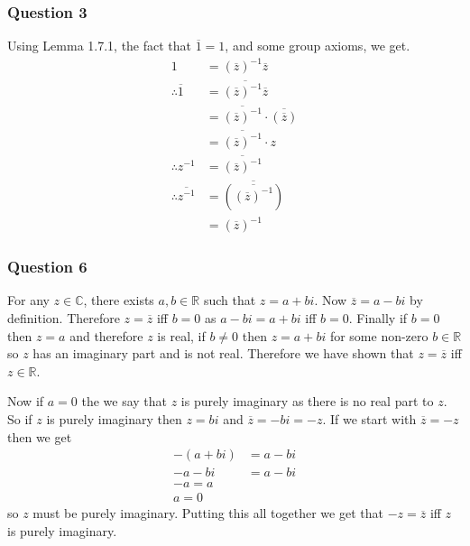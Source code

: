 \documentclass{article}
\begin{document}
\subsubsection{Question 3}
Using Lemma 1.7.1, the fact that $\overline 1 = 1$, and some group axioms, we get.
\begin{align*}
1 &= (\overline z)^{-1}\overline z \\
\therefore \overline 1 &= \overline{(\overline z)^{-1}\overline z} \\
&= \overline{(\overline z)^{-1}}\cdot\overline{(\overline z)} \\
&= \overline{(\overline z)^{-1}} \cdot z \\
\therefore z^{-1} &= \overline{(\overline z)^{-1}} \\
\therefore \overline{z^{-1}} &= \overline{\left(\overline{(\overline z)^{-1}}\right)} \\
&= (\overline z)^{-1}
\end{align*}

\subsubsection{Question 6}

For any $z \in\mathbb C$, there exists $a,b\in\mathbb R$ such that $z = a+bi$. Now $\overline z = a-bi$ by definition. Therefore $z = \overline z$ iff $b=0$ as $a-bi = a+bi$ iff $b=0$. Finally if $b=0$ then $z = a$ and therefore $z$ is real, if $b\not=0$ then $z=a+bi$ for some non-zero $b\in\mathbb R$ so $z$ has an imaginary part and is not real. Therefore we have shown that $z = \overline z$ iff $z\in\mathbb R$.

Now if $a=0$ the we say that $z$ is purely imaginary as there is no real part to $z$. So if $z$ is purely imaginary then $z = bi$ and $\overline z = -bi = -z$. If we start with $\overline z = -z$ then we get 
\begin{align*}
-(a+bi) &= a-bi \\
-a-bi &= a-bi \\
-a = a\\
a = 0
\end{align*}
so $z$ must be purely imaginary. Putting this all together we get that $-z=\overline z$ iff $z$ is purely imaginary.



\end{document}

